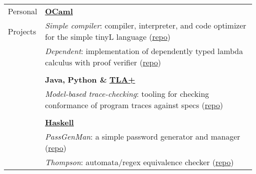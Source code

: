 \documentclass[letterpaper,10pt,oneside]{article}
\begin{document}
\noindent \begin{tabular}{@{} l l}
 \Large{Personal} & \href{https://github.com/Isaac-DeFrain?tab=repositories&q=&type=&language=ocaml&sort=}{\textbf{OCaml}} \\
 \Large{Projects} & \emph{Simple compiler}: compiler, interpreter, and code optimizer for the simple tinyL language (\href{https://github.com/Isaac-DeFrain/simple-compiler}{repo}) \\
 \hspace{1.1in} & \emph{Dependent}: implementation of dependently typed lambda calculus with proof verifier (\href{https://github.com/Isaac-DeFrain/dependent}{repo}) \\
 & \\
 & \textbf{Java,} \textbf{Python \&} \href{https://github.com/Isaac-DeFrain?tab=repositories&q=&type=&language=tla&sort=}{\textbf{TLA+}} \\
 & \emph{Model-based trace-checking}: tooling for checking conformance of program traces against specs (\href{https://github.com/Isaac-DeFrain/model-based-trace-checking}{repo}) \\
 & \\
 & \href{https://github.com/Isaac-DeFrain?tab=repositories&q=&type=&language=haskell&sort=}{\textbf{Haskell}} \\
 & \emph{PassGenMan}: a simple password generator and manager (\href{https://github.com/Isaac-DeFrain/PassGenMan}{repo}) \\
 & \emph{Thompson}: automata/regex equivalence checker (\href{https://github.com/Isaac-DeFrain/Thompson}{repo}) \\
\end{tabular}

\vfill

\end{document}
